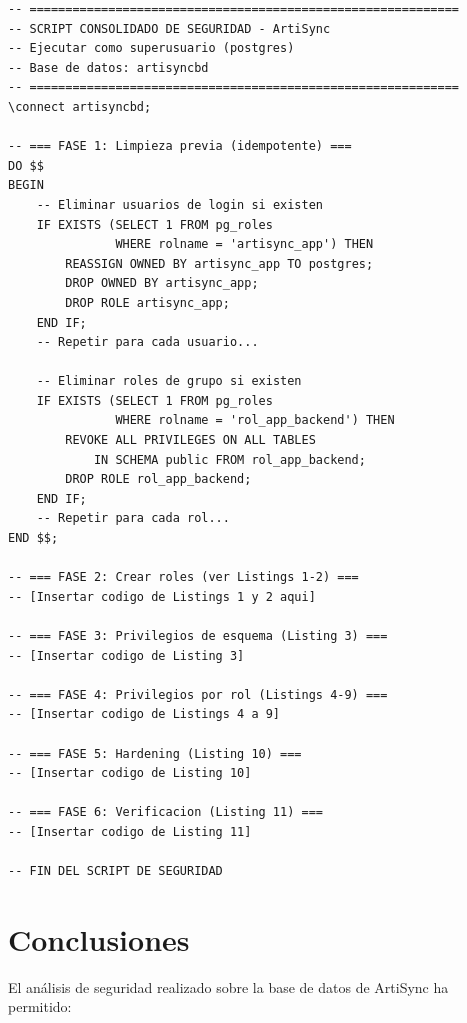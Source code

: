 \documentclass[conference, onecolumn]{IEEEtran}
\begin{document}
\begin{lstlisting}[caption={Script consolidado de seguridad (resumen)}, label={lst:script_completo}]
-- ============================================================
-- SCRIPT CONSOLIDADO DE SEGURIDAD - ArtiSync
-- Ejecutar como superusuario (postgres)
-- Base de datos: artisyncbd
-- ============================================================
\connect artisyncbd;

-- === FASE 1: Limpieza previa (idempotente) ===
DO $$
BEGIN
    -- Eliminar usuarios de login si existen
    IF EXISTS (SELECT 1 FROM pg_roles
               WHERE rolname = 'artisync_app') THEN
        REASSIGN OWNED BY artisync_app TO postgres;
        DROP OWNED BY artisync_app;
        DROP ROLE artisync_app;
    END IF;
    -- Repetir para cada usuario...

    -- Eliminar roles de grupo si existen
    IF EXISTS (SELECT 1 FROM pg_roles
               WHERE rolname = 'rol_app_backend') THEN
        REVOKE ALL PRIVILEGES ON ALL TABLES
            IN SCHEMA public FROM rol_app_backend;
        DROP ROLE rol_app_backend;
    END IF;
    -- Repetir para cada rol...
END $$;

-- === FASE 2: Crear roles (ver Listings 1-2) ===
-- [Insertar codigo de Listings 1 y 2 aqui]

-- === FASE 3: Privilegios de esquema (Listing 3) ===
-- [Insertar codigo de Listing 3]

-- === FASE 4: Privilegios por rol (Listings 4-9) ===
-- [Insertar codigo de Listings 4 a 9]

-- === FASE 5: Hardening (Listing 10) ===
-- [Insertar codigo de Listing 10]

-- === FASE 6: Verificacion (Listing 11) ===
-- [Insertar codigo de Listing 11]

-- FIN DEL SCRIPT DE SEGURIDAD
\end{lstlisting}

\section{Conclusiones}

El análisis de seguridad realizado sobre la base de datos de ArtiSync ha permitido:
\end{document}
